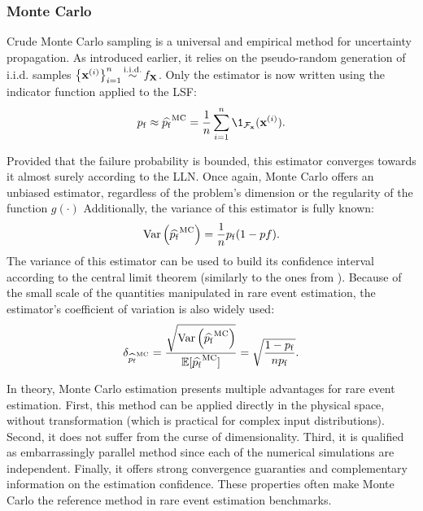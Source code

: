 \subsubsection{Monte Carlo}
Crude Monte Carlo sampling is a universal and empirical method for uncertainty propagation. 
As introduced earlier, it relies on the pseudo-random generation of i.i.d. samples $\left\{{\bf x}^{(i)}\right\}_{i=1}^n \mathop{\sim}\limits^{\mathrm{i.i.d.}} f_{\bf X}$.   
Only the estimator is now written using the indicator function applied to the LSF: 
\begin{equation}
    \pf \approx \what{\pf}^{\textrm{MC}} = \frac1n \sum_{i=1}^{n} \1_{\iF_\bx}(\bx^{(i)}).
\end{equation} 

Provided that the failure probability is bounded, this estimator converges towards it almost surely according to the LLN. 
Once again, Monte Carlo offers an unbiased estimator, regardless of the problem's dimension or the regularity of the function $g(\cdot)$  
Additionally, the variance of this estimator is fully known:
\begin{equation}
    \operatorname{Var}\left(\widehat{p_\mathrm{f}}^{\textrm{MC}}\right) = \frac1n p_\mathrm{f} (1 - pf).
\end{equation} 
The variance of this estimator can be used to build its confidence interval according to the central limit theorem (similarly to the ones from ). 
Because of the small scale of the quantities manipulated in rare event estimation, the estimator's coefficient of variation is also widely used: 
\begin{equation}
    \delta_{\widehat{p_\mathrm{f}}^{\textrm{MC}}} = \frac{\sqrt{\operatorname{Var}\left(\widehat{p_\mathrm{f}}^{\textrm{MC}}\right)}}{\mathbb{E}[\widehat{p_\mathrm{f}}^{\textrm{MC}}]}
                                      = \sqrt{\frac{1 - p_\mathrm{f}}{n p_\mathrm{f}}}.
\end{equation}

In theory, Monte Carlo estimation presents multiple advantages for rare event estimation. 
First, this method can be applied directly in the physical space, without transformation (which is practical for complex input distributions). 
Second, it does not suffer from the curse of dimensionality. 
Third, it is qualified as embarrassingly parallel method since each of the numerical simulations are independent. 
Finally, it offers strong convergence guaranties and complementary information on the estimation confidence. 
These properties often make Monte Carlo the reference method in rare event estimation benchmarks. 

